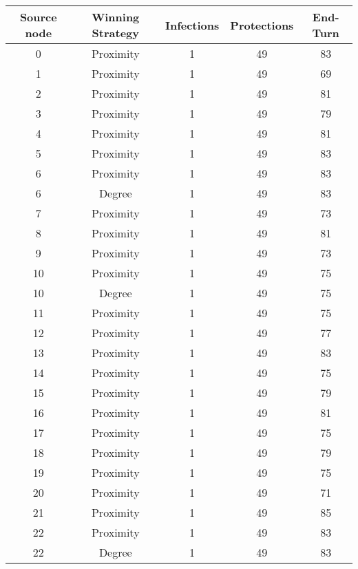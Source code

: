 \documentclass[results.tex]{subfiles}
\begin{document}
\begin{center}
  \begin{tabular}{| c || c | c | c | c |}
    \hline
    {\bfseries Source node} & {\bfseries Winning Strategy} & {\bfseries Infections} & {\bfseries Protections} & {\bfseries End-Turn} \\  %
    \hline\hline
    0 & Proximity & 1 & 49 & 83 \\ 
    \hline
    1 & Proximity & 1 & 49 & 69 \\ 
    \hline
    2 & Proximity & 1 & 49 & 81 \\ 
    \hline
    3 & Proximity & 1 & 49 & 79 \\ 
    \hline
    4 & Proximity & 1 & 49 & 81 \\ 
    \hline
    5 & Proximity & 1 & 49 & 83 \\ 
    \hline
    6 & Proximity & 1 & 49 & 83 \\ 
    \hline
    6 & Degree & 1 & 49 & 83 \\ 
    \hline
    7 & Proximity & 1 & 49 & 73 \\ 
    \hline
    8 & Proximity & 1 & 49 & 81 \\ 
    \hline
    9 & Proximity & 1 & 49 & 73 \\ 
    \hline
    10 & Proximity & 1 & 49 & 75 \\ 
    \hline
    10 & Degree & 1 & 49 & 75 \\ 
    \hline
    11 & Proximity & 1 & 49 & 75 \\ 
    \hline
    12 & Proximity & 1 & 49 & 77 \\ 
    \hline
    13 & Proximity & 1 & 49 & 83 \\ 
    \hline
    14 & Proximity & 1 & 49 & 75 \\ 
    \hline
    15 & Proximity & 1 & 49 & 79 \\ 
    \hline
    16 & Proximity & 1 & 49 & 81 \\ 
    \hline
    17 & Proximity & 1 & 49 & 75 \\ 
    \hline
    18 & Proximity & 1 & 49 & 79 \\ 
    \hline
    19 & Proximity & 1 & 49 & 75 \\ 
    \hline
    20 & Proximity & 1 & 49 & 71 \\ 
    \hline
    21 & Proximity & 1 & 49 & 85 \\ 
    \hline
    22 & Proximity & 1 & 49 & 83 \\ 
    \hline
    22 & Degree & 1 & 49 & 83 \\ 

\end{tabular}
\end{center}
\end{document}
